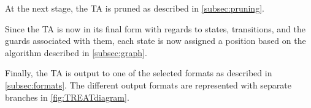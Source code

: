 At the next stage, the TA is pruned as described in \cref{subsec:pruning}. 

Since the TA is now in its final form with regards to states, transitions, and the guards associated with them, each state is now assigned a position based on the algorithm described in \cref{subsec:graph}.

Finally, the TA is output to one of the selected formats as described in \cref{subsec:formats}. The different output formats are represented with separate branches in \cref*{fig:TREATdiagram}.

